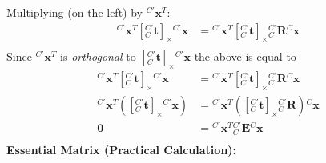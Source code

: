 \documentclass[a4paper,10pt]{article}
\newcommand{\spppnhx}[3]{\ensuremath{{^{#1}_{#2}}\mathbf{{{#3}}}}}
\begin{document}
Multiplying (on the left) by $^{C'}\mathbf{x}^{T}$:
\newline\noindent\newline\noindent
\begin{equation*}
\begin{split}
{^{C'}\mathbf{x}^{T}}{[\spppnhx{C'}{C}{t}]_{\times}}{^{C'}\mathbf{x}} &=
{^{C'}\mathbf{x}^{T}}{[\spppnhx{C'}{C}{t}]_{\times}}{\spppnhx{C'}{C}{R}}{^{C}\mathbf{x}}\\
\end{split}
\end{equation*}
Since $^{C'}\mathbf{x}^{T}$ is \emph{orthogonal} to ${[\spppnhx{C'}{C}{t}]_{\times}}{^{C'}\mathbf{x}}$ the above is equal to
\begin{equation*}
\begin{split}
{^{C'}\mathbf{x}^{T}}{[\spppnhx{C'}{C}{t}]_{\times}}{^{C'}\mathbf{x}} &=
{^{C'}\mathbf{x}^{T}}{[\spppnhx{C'}{C}{t}]_{\times}}{\spppnhx{C'}{C}{R}}{^{C}\mathbf{x}}\\
{^{C'}\mathbf{x}^{T}}\left({[\spppnhx{C'}{C}{t}]_{\times}}{^{C'}\mathbf{x}}\right) &=
{^{C'}\mathbf{x}^{T}}\left({[\spppnhx{C'}{C}{t}]_{\times}}{\spppnhx{C'}{C}{R}}\right){^{C}\mathbf{x}}\\
\mathbf{0}&={^{C'}\mathbf{x}^{T}}{^{C'}_{C}\mathbf{E}}{^{C}\mathbf{x}}\\
\end{split}
\end{equation*}
\newline\noindent\newline\noindent
\textbf{Essential Matrix (Practical Calculation):}
\newline\noindent
\end{document}
